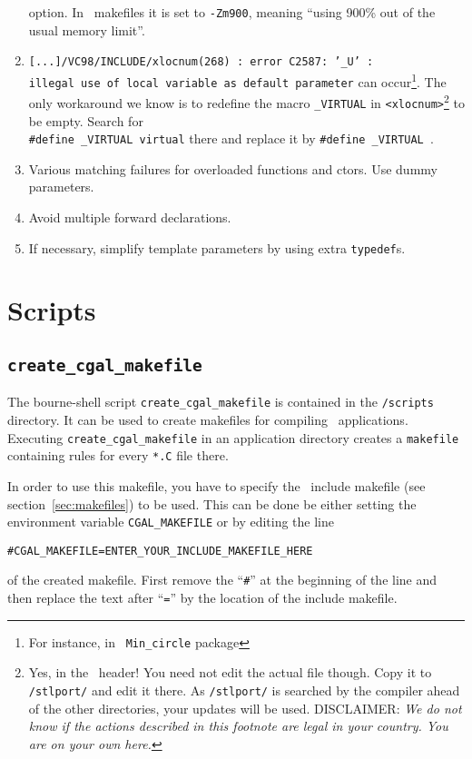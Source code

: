 \begin{enumerate}
option. In \cgal\ makefiles it is set to \texttt{-Zm900}, meaning
``using 900\% out of the usual memory limit''. \label{msvc::Zm}
%
\item \texttt{[...]/VC98/INCLUDE/xlocnum(268) :
    error C2587: '\_U' :\\
    illegal use of local variable as default parameter} can
  occur\footnote{For instance, in \cgal\ \texttt{Min\_circle}
    package}. The only workaround we know is to redefine the macro
  \texttt{\_VIRTUAL} in \texttt{<xlocnum>}\footnote{Yes, in the \msvc\ 
    header! You need not edit the actual file though. Copy it to
    \cgaldir\texttt{/stlport/} and edit it there. As
    \cgaldir\texttt{/stlport/} is searched by the compiler ahead of
    the other directories, your updates will be used.  DISCLAIMER:
    {\em We do not know if the actions described in this footnote are
      legal in your country. You are on your own here.}}
  to be empty. Search for\\
  \texttt{\#define~\_VIRTUAL~virtual} there and replace it by
  \texttt{\#define~\_VIRTUAL~}. \label{msvc::VIRTUAL}
%
\item Various matching failures for overloaded functions and ctors.
Use dummy parameters.
%
\item Avoid multiple forward declarations.
%
\item If necessary, simplify template parameters by using extra 
\texttt{typedef}s.
\end{enumerate}

\section{Scripts}

\subsection{\texttt{create\_cgal\_makefile}}\label{sec:create_cgal_makefile}

The bourne-shell script \texttt{create\_cgal\_makefile} is contained
in the \cgaldir\texttt{/scripts} directory. It can be used to create
makefiles for compiling \cgal\ applications. Executing
\texttt{create\_cgal\_makefile} in an application directory creates a
\texttt{makefile} containing rules for every \texttt{*.C} file there.

In order to use this makefile, you have to specify the \cgal\ include
makefile (see section~\ref{sec:makefiles}) to be used. This can be
done be either setting the environment variable
\texttt{CGAL\_MAKEFILE} or by editing the line
\begin{alltt}
  # CGAL_MAKEFILE = ENTER_YOUR_INCLUDE_MAKEFILE_HERE
\end{alltt}
of the created makefile. First remove the ``\texttt{\#}'' at the
beginning of the line and then replace the text after ``\texttt{=}''
by the location of the include makefile. 

